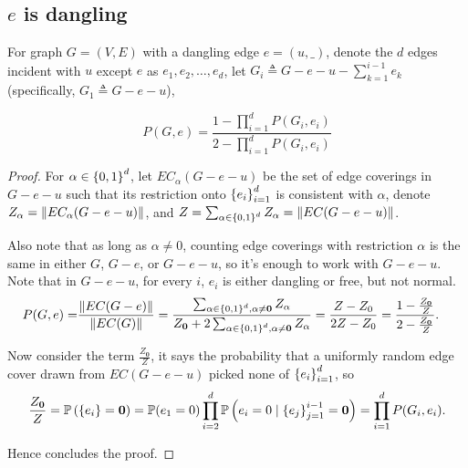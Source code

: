 \subsection{$e$ is dangling}
For graph $G=(V,E)$ with a dangling edge $e=(u,\_)$, denote the $d$
edges incident with $u$ except $e$ as $e_1, e_2, \ldots, e_d$,
let $G_i \triangleq G - e - u - \sum_{k=1}^{i-1} e_k$ (specifically, $G_1 \triangleq G - e - u$), 
\begin{Prop}
	\begin{equation}
		P(G, e) = \frac{1-\prod_{i=1}^d P(G_i, e_i)}{2 - \prod_{i=1}^d P(G_i, e_i)} %
		\label{propp3rg}
	\end{equation}
\end{Prop}
\begin{proof}
	For $\alpha \in \left\{0,1\right\}^d$, let $EC_{\alpha}(G-e-u)$ be the set of edge coverings in $G-e-u$ such that its restriction onto $\left\{e_i\right\}_{i=1}^{d}$ is consistent with $\alpha$, denote $Z_{\alpha} = \left\Vert EC_{\alpha}(G-e-u)\right\Vert$, and $Z = \sum_{\alpha \in \left\{0,1\right\}^d} Z_{\alpha} = \left\Vert EC(G-e-u)\right\Vert$. %

		Also note that as long as $\alpha \neq 0$, counting edge coverings with restriction $\alpha$ is the same in either $G$, $G-e$, or $G-e-u$, so it's enough to work with $G-e-u$. Note that in $G-e-u$, for every $i$, $e_i$ is either dangling or free, but not normal.
	\begin{align*}
		P(G,e) = & \frac{\left\Vert EC(G-e)\right\Vert}{\left\Vert EC(G)\right\Vert} 
		= \frac{\sum_{\alpha \in \left\{0,1\right\}^d, \alpha \neq \mathbf{0}} Z_{\alpha} }{ Z_{\mathbf{0}} + 2 \sum_{\alpha \in \left\{0,1\right\}^d, \alpha \neq \mathbf{0}} Z_{\alpha}} 
		=\frac{Z - Z_0}{2 Z - Z_0}
		= \frac{1 - \frac{Z_{\mathbf{0}}}{Z}}{ 2 - \frac{Z_{\mathbf{0}}}{Z}}.
	\end{align*}

	Now consider the term $\frac{Z_{\mathbf{0}}}{Z}$, it says the probability that a uniformly random edge cover drawn from $EC(G-e-u)$ picked none of $\left\{e_i\right\}_{i=1}^{d}$, so
	\begin{align*}
		\frac{Z_{\mathbf{0}}}{Z}=\mathbb{P} \left( \left\{e_i\right\} = \mathbf{0}\right) = \mathbb{P} (e_1 = 0) \prod_{i=2}^d \mathbb{P} \left(e_i = 0 \mid \left\{e_j\right\}_{j=1}^{i-1} = \mathbf{0}\right) = \prod_{i=1}^d P(G_i, e_i).
	\end{align*}

	Hence concludes the proof.
	
\end{proof}


